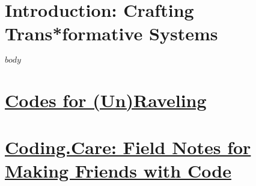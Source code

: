 \documentclass[11pt,oneside]{scrbook} %
\begin{document}
\newpage
{}%
\setcounter{page}{1}

\chapter{Introduction: Crafting Trans*formative Systems}

$body$
% 













\chapter{\href{https://coding.care/unraveling.html}{Codes for (Un)Raveling}}

\chapter{\href{https://coding.care/guide.html}{Coding.Care: Field Notes for Making Friends with Code}}
\end{document}
